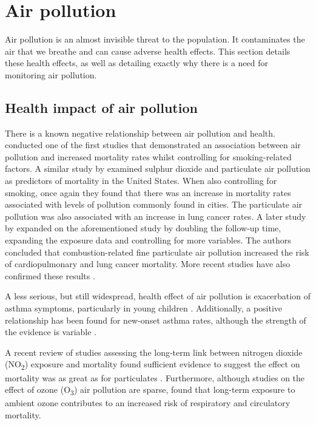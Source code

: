 \documentclass[11pt]{report}
\begin{document}
\section{Air pollution}

Air pollution is an almost invisible threat to the population. It contaminates the air that we breathe and can cause adverse health effects. This section details these health effects, as well as detailing exactly why there is a need for monitoring air pollution.

\subsection{Health impact of air pollution} \label{healthimpact}

There is a known negative relationship between air pollution and health. \cite{dockery1993_6cityairpoll} conducted one of the first studies that demonstrated an association between air pollution and increased mortality rates whilst controlling for smoking-related factors. A similar study by \cite{pope1995particulate} examined sulphur dioxide and particulate air pollution as predictors of mortality in the United States. When also controlling for smoking, once again they found that there was an increase in mortality rates associated with levels of pollution commonly found in cities. The particulate air pollution was also associated with an increase in lung cancer rates. A later study by \cite{pope2002lungcancercardiomortality} expanded on the aforementioned study by doubling the follow-up time, expanding the exposure data and controlling for more variables. The authors concluded that combustion-related fine particulate air pollution increased the risk of cardiopulmonary and lung cancer mortality. More recent studies have also confirmed these results \citep{Anderson2012clearingtheair,Beelen2014escapeproject}.

A less serious, but still widespread, health effect of air pollution is exacerbation of asthma symptoms, particularly in young children \citep{jerrett2008childasthma}. Additionally, a positive relationship has been found for new-onset asthma rates, although the strength of the evidence is variable \citep{guarnieri2014outdoorairpollasthma}.

A recent review of studies assessing the long-term link between nitrogen dioxide (NO\textsubscript{2}) exposure and mortality found sufficient evidence to suggest the effect on mortality was as great as for particulates \citep{Faustini2014nitrogenmortality}. Furthermore, although studies on the effect of ozone (O\textsubscript{3}) air pollution are sparse, \cite{Turner2016ozonemortality} found that long-term exposure to ambient ozone contributes to an increased risk of respiratory and circulatory mortality.
\end{document}

